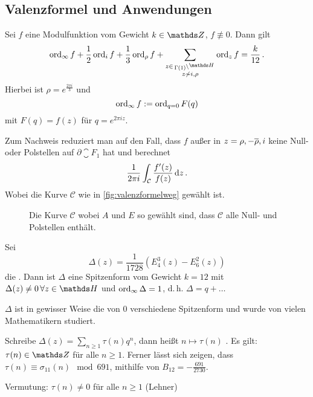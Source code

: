 \subsection{Valenzformel und Anwendungen}

\begin{satz}[Valenzformel]
	Sei $f$ eine Modulfunktion vom Gewicht $k \in \ZZ$, $f \not \equiv 0$. Dann gilt
	\[
	\ord_\infty f + \frac 12 \ord_i f + \frac 13 \ord_\rho f + \sum_{\substack{z \in \linksmodulo{\Gamma(1)}{\HH} \\ z \not \sim i, \rho}} \ord_z f = \frac {k}{12}
	\,.
	\]
	Hierbei ist $\rho = e^{\frac{2 \pi i}{3}}$ und
	\[
	\operatorname{ord}_\infty f := \operatorname{ord}_{q = 0} F(q)
	\]
	mit $F(q) = f(z)$ für $q = e^{2\pi i z}$.
\end{satz}

\begin{bewe}
	Zum Nachweis reduziert man auf den Fall, dass $f$ außer in $z = \rho, - \overline{\rho}, i$ keine Null- oder Polstellen auf $\partial \closure{F_1}$ hat und berechnet
	\[
	\frac{1}{2\pi i} \int_{\mathcal C} \frac{f'(z)}{f(z)} \,\mathrm{d} z
	\,.
	\]
	Wobei die Kurve $\mathcal C$ wie in \autoref{fig:valenzformelweg} gewählt ist.
	
	\begin{figure}
		\begin{center}
			
			\caption{Die Kurve $\mathcal C$ wobei $A$ und $E$ so gewählt sind, dass $\mathcal C$ alle Null- und Polstellen enthält.}
			\label{fig:valenzformelweg}
		\end{center}
	\end{figure}
\end{bewe}

\begin{defi}
	Sei
	\[
	\Delta (z) = \frac{1}{1728} \left( E_4^3(z) - E_6^2(z) \right)
	\]
	die . Dann ist $\Delta$ eine Spitzenform vom Gewicht $k = 12$ mit $\Delta(z) \neq 0 \, \forall z \in \HH$ und $\operatorname{ord}_\infty \Delta = 1$, d.\,h. $\Delta = q + \ldots$
\end{defi}

\begin{beme}
	$\Delta$ ist in gewisser Weise die  von 0 verschiedene Spitzenform und wurde von vielen Mathematikern studiert.
	
	\begin{bsp-list}
		\item Schreibe $\Delta(z) = \sum_{n \geq 1} \tau (n) q^n$, dann heißt $n \mapsto \tau (n)$ . Es gilt: $\tau (n) \in \ZZ$ für alle $n \geq 1$. Ferner lässt sich zeigen, dass $\tau (n) \equiv \sigma_{11}(n) \mod 691$, mithilfe von $B_{12} = - \frac{691}{2730}$.
		\item Vermutung: $\tau (n) \neq 0$ für alle $n \geq 1$ (Lehner)
	\end{bsp-list}
	
\end{beme}


